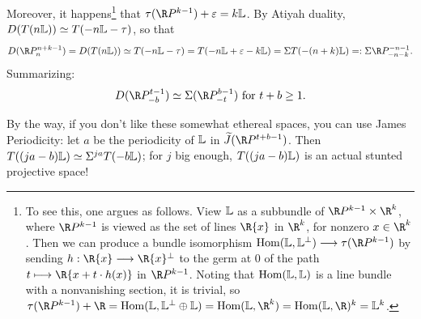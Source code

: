 Moreover, it happens\footnote{To see this, one argues as follows. View $\mathbb{L}$ as a subbundle of $\RP^{k-1}\times \R^k$, where $\RP^{k-1}$ is viewed as the set of lines $\R\{x\}$ in $\R^k$, for nonzero $x\in\R^k$. Then we can produce a bundle isomorphism $\Hom(\bundle{L},\bundle{L}^\perp)\to\tau(\RP^{k-1})$ by sending $h:\R\{x\}\to \R\{x\}^\perp$ to the germ at $0$ of the path $t\mapsto \R\{x+t\cdot h(x)\}$ in $\RP^{k-1}$. Noting that $\operatorname{Hom}(\mathbb{L},\mathbb{L})$ is a line bundle with a nonvanishing section, it is trivial, so $\tau(\RP^{k-1})+\R=\Hom(\bundle L,\bundle L^\perp\oplus\bundle L)=\Hom(\bundle L,\R^k)=\Hom(\bundle L,\R)^k=\bundle L^k$.} that $\tau(\RP^{k-1}) + \varepsilon = k \bundle{L}$.
By Atiyah duality, $D(T(n\mathbb{L})) \simeq T(-n \mathbb{L} - \tau)$, so that
\[D(\RP^{n+k-1}_n) = D(T(n\bundle{L})) \simeq T(-n \bundle{L} - \tau) = T(-n \bundle{L} + \varepsilon -k \bundle{L}) = \Suspend T(-(n+k)\bundle{L}) =: \Suspend \RP^{-n-1}_{-n-k}.\]
Summarizing:
\[D(\RP^{t-1}_{-b}) \simeq \Suspend (\RP^{b-1}_{-t})\text{ for }t+b\geq1.\]

By the way, if you don't like these somewhat ethereal spaces, you can use James Periodicity: let $a$ be the periodicity of $\mathbb{L}$ in $\widetilde J(\RP^{t+b-1})$.  Then $T((ja-b)\mathbb{L}) \simeq \Sigma^{ja} T(-b \mathbb{L})$; for $j$ big enough, $T((ja-b)\mathbb{L})$ is an actual stunted projective space!

